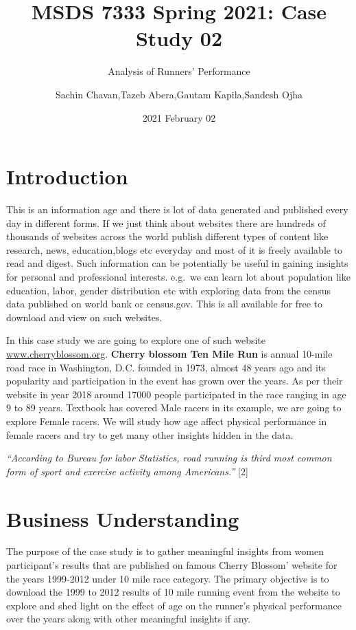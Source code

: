 \documentclass[
]{article}
\title{MSDS 7333 Spring 2021: Case Study 02}
\subtitle{Analysis of Runners' Performance}
\author{Sachin Chavan,Tazeb Abera,Gautam Kapila,Sandesh Ojha}
\date{2021 February 02}
\begin{document}
\maketitle

\hypertarget{introduction}{%
\section{Introduction}\label{introduction}}

This is an information age and there is lot of data generated and
published every day in different forms. If we just think about websites
there are hundreds of thousands of websites across the world publish
different types of content like research, news, education,blogs etc
everyday and most of it is freely available to read and digest. Such
information can be potentially be useful in gaining insights for
personal and professional interests. e.g.~we can learn lot about
population like education, labor, gender distribution etc with exploring
data from the census data published on world bank or census.gov. This is
all available for free to download and view on such websites.

In this case study we are going to explore one of such website
\href{http://www.cherryblossom.org/}{www.cherryblossom.org}.
\textbf{Cherry blossom Ten Mile Run} is annual 10-mile road race in
Washington, D.C. founded in 1973, almost 48 years ago and its popularity
and participation in the event has grown over the years. As per their
website in year 2018 around 17000 people participated in the race
ranging in age 9 to 89 years. Textbook has covered Male racers in its
example, we are going to explore Female racers. We will study how age
affect physical performance in female racers and try to get many other
insights hidden in the data.

\emph{``According to Bureau for labor Statistics, road running is third
most common form of sport and exercise activity among Americans.''}
{[}2{]}

\hypertarget{business-understanding}{%
\section{Business Understanding}\label{business-understanding}}

The purpose of the case study is to gather meaningful insights from
women participant's results that are published on famous Cherry Blossom'
website for the years 1999-2012 under 10 mile race category. The primary
objective is to download the 1999 to 2012 results of 10 mile running
event from the website to explore and shed light on the effect of age on
the runner's physical performance over the years along with other
meaningful insights if any.
\end{document}
